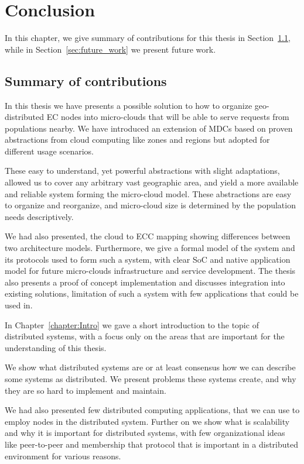 \chapter{Conclusion}\label{chapter:Conclusion}
%
In this chapter, we give summary of contributions for this thesis in Section~\ref{sec:summary_of_contributions}, while in Section~\ref{sec:future_work} we present future work.
%
%
\section{Summary of contributions}\label{sec:summary_of_contributions}
%
In this thesis we have presents a possible solution to how to organize geo-distributed EC nodes into micro-clouds that will be able to serve requests from populations nearby. We have introduced an extension of MDCs based on proven abstractions from cloud computing like zones and regions but adopted for different usage scenarios.

These easy to understand, yet powerful abstractions with slight adaptations, allowed us to cover any arbitrary vast geographic area, and yield a more available and reliable system forming the micro-cloud model. These abstractions are easy to organize and reorganize, and micro-cloud size is determined by the population needs descriptively. 

We had also presented, the cloud to ECC mapping showing differences between two architecture models. Furthermore, we give a formal model of the system and its protocols used to form such a system, with clear SoC and native application model for future micro-clouds infrastructure and service development. The thesis also presents a proof of concept implementation and discusses integration into existing solutions, limitation of such a system with few applications that could be used in.

In Chapter~\ref{chapter:Intro} we gave a short introduction to the topic of distributed systems, with a focus only on the areas that are important for the understanding of this thesis. 

We show what distributed systems are or at least consensus how we can describe some systems as distributed. We present problems these systems create, and why they are so hard to implement and maintain. 

We had also presented few distributed computing applications, that we can use to employ nodes in the distributed system. Further on we show what is scalability and why it is important for distributed systems, with few organizational ideas like peer-to-peer and membership that protocol that is important in a distributed environment for various reasons.

